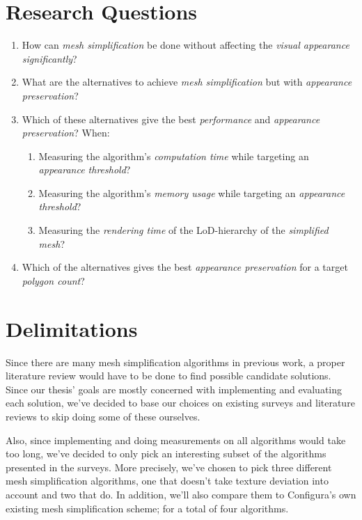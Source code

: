 \section{Research Questions}
\label{sec:research-questions}

\begin{enumerate}
    \item How can \emph{mesh simplification} be done without affecting the \emph{visual appearance significantly}?

\item What are the alternatives to achieve \emph{mesh simplification} but with \emph{appearance preservation}?

\item{Which of these alternatives give the best \emph{performance} and \emph{appearance preservation}? When:
  \begin{enumerate}
  \item Measuring the algorithm's \emph{computation time} while targeting an \emph{appearance threshold}?
  \item Measuring the algorithm's \emph{memory usage} while targeting an \emph{appearance threshold}?
  \item Measuring the \emph{rendering time} of the LoD-hierarchy of the \emph{simplified mesh}?
  \end{enumerate}
}
\item Which of the alternatives gives the best \emph{appearance preservation} for a target \emph{polygon count}?
\end{enumerate}


\section{Delimitations}
\label{sec:delimitations}

Since there are many mesh simplification algorithms in previous work, a proper literature review would have to be done to find possible candidate solutions. Since our thesis' goals are mostly concerned with implementing and evaluating each solution, we've decided to base our choices on existing surveys and literature reviews to skip doing some of these ourselves.

Also, since implementing and doing measurements on all algorithms would take too long, we've decided to only pick an interesting subset of the algorithms presented in the surveys. More precisely, we've chosen to pick three different mesh simplification algorithms, one that doesn't take texture deviation into account and two that do. In addition, we'll also compare them to Configura's own existing mesh simplification scheme; for a total of four algorithms.

